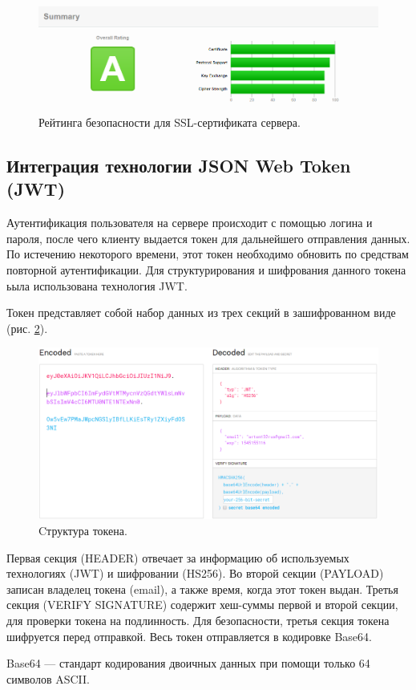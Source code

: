 \begin{figure}[h]
    \centering
    \includegraphics[width=1\linewidth]{img/https_score.png}
    \caption{Рейтинга безопасности для SSL-сертификата сервера.}
    \label{fig:https_score}
\end{figure}


\clearpage
\subsection{Интеграция технологии JSON Web Token (JWT)}
Аутентификация пользователя на сервере происходит с помощью логина и пароля, после чего клиенту выдается токен для дальнейшего отправления данных.
По истечению некоторого времени, этот токен необходимо обновить по средствам повторной аутентификации.
Для структурирования и шифрования данного токена ьыла использована технология JWT.

Токен представляет собой набор данных из трех секций в зашифрованном виде (рис. \ref{fig:token1}).
\begin{figure}[h]
    \centering
    \includegraphics[width=1\linewidth]{img/token1.png}
    \caption{Cтруктура токена.}
    \label{fig:token1}
\end{figure}
Первая секция (HEADER) отвечает за информацию об используемых технологиях (JWT) и шифровании (HS256).
Во второй секции (PAYLOAD) записан владелец токена (email), а также время, когда этот токен выдан.
Третья секция (VERIFY SIGNATURE) содержит хеш-суммы первой и второй секции, для проверки токена на подлинность.
Для безопасности, третья секция токена шифруется перед отправкой. Весь токен отправляется в кодировке Base64.
\begin{definition}
   Base64 --- стандарт кодирования двоичных данных при помощи только 64 символов ASCII.
\end{definition}


